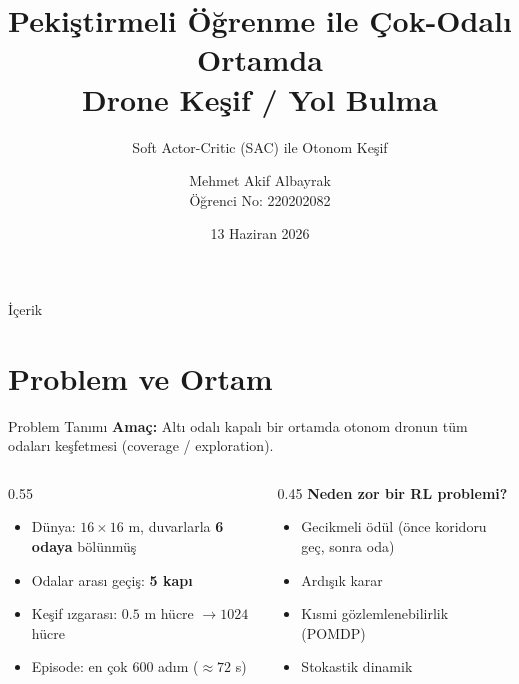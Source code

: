 \documentclass[aspectratio=169,11pt]{beamer}
\title[RL Drone Keşif]{Pekiştirmeli Öğrenme ile Çok-Odalı Ortamda\\Drone Keşif / Yol Bulma}
\subtitle{Soft Actor-Critic (SAC) ile Otonom Keşif}
\author[M. A. Albayrak]{Mehmet Akif Albayrak \\ \small Öğrenci No: 220202082}
\date{13 Haziran 2026}
\begin{document}
\begin{frame}[plain]
  \titlepage
\end{frame}

\begin{frame}{İçerik}
  \tableofcontents
\end{frame}

\section{Problem ve Ortam}
\begin{frame}{Problem Tanımı}
  \textbf{Amaç:} Altı odalı kapalı bir ortamda otonom dronun \alert{tüm odaları
  keşfetmesi} (coverage / exploration).
  \vfill
  \begin{columns}[T]
    \begin{column}{0.55\textwidth}
      \begin{itemize}
        \item Dünya: $16\times 16$ m, duvarlarla \textbf{6 odaya} bölünmüş
        \item Odalar arası geçiş: \textbf{5 kapı}
        \item Keşif ızgarası: $0.5$ m hücre $\rightarrow 1024$ hücre
        \item Episode: en çok $600$ adım ($\approx 72$ s)
      \end{itemize}
    \end{column}
    \begin{column}{0.45\textwidth}
      \footnotesize
      \textbf{Neden zor bir RL problemi?}
      \begin{itemize}
        \item Gecikmeli ödül (önce koridoru geç, sonra oda)
        \item Ardışık karar
        \item Kısmi gözlemlenebilirlik (POMDP)
        \item Stokastik dinamik
      \end{itemize}
    \end{column}
  \end{columns}
\end{frame}
\end{document}
